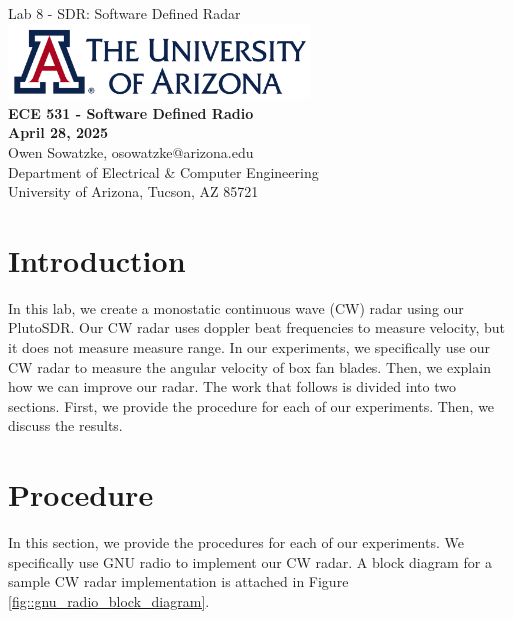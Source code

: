 \documentclass{article}
\begin{document}
\begin{titlepage}
	\centering
	{\huge Lab 8 - SDR: Software Defined Radar}\\[0.25 in]
	\includegraphics[width=0.6\textwidth]{ua_logo.png}\\[0.25 in]
	{\large \textbf{ECE 531 - Software Defined Radio\\[0.25 in]
	April 28, 2025\\[0.25 in]}}
	{\large Owen Sowatzke, osowatzke@arizona.edu\\[0.05 in]
	Department of Electrical \& Computer Engineering\\[0.05 in]
	University of Arizona, Tucson, AZ 85721\\[0.5 in]}
	\hypersetup{linkcolor=navy-blue}
	\noindent\hrulefill
	\tableofcontents
	\noindent\hrulefill
\end{titlepage}


\section{Introduction}

In this lab, we create a monostatic continuous wave (CW) radar using our PlutoSDR. Our CW radar uses doppler beat frequencies to measure velocity, but it does not measure measure range. In our experiments, we specifically use our CW radar to measure the angular velocity of box fan blades. Then, we explain how we can improve our radar. The work that follows is divided into two sections. First, we provide the procedure for each of our experiments. Then, we discuss the results. 

\section{Procedure}

In this section, we provide the procedures for each of our experiments. We specifically use GNU radio to implement our CW radar. A block diagram for a sample CW radar implementation is attached in Figure \ref{fig::gnu_radio_block_diagram}.
\end{document}
